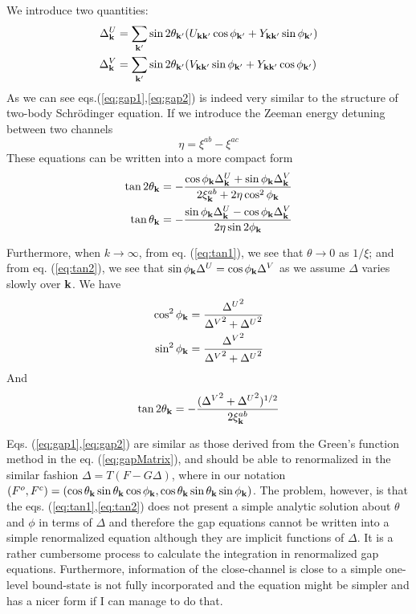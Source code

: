 We introduce two quantities:
\begin{align}
\Delta_{\mathbf{k}}^U&=\sum_{\mathbf{k}'}\sin2\theta_{\mathbf{k}'}(U_{\mathbf{k}\mathbf{k}'}\cos\phi_{\mathbf{k}'}+Y_{\mathbf{k}\mathbf{k}'}\sin\phi_{\mathbf{k}'})\label{eq:gap1}\\
\Delta_{\mathbf{k}}^V&=\sum_{\mathbf{k}'}\sin2\theta_{\mathbf{k}'}(V_{\mathbf{k}\mathbf{k}'}\sin\phi_{\mathbf{k}'}+Y_{\mathbf{k}\mathbf{k}'}\cos\phi_{\mathbf{k}'})\label{eq:gap2}
\end{align} 
As we can see eqs.(\ref{eq:gap1},\ref{eq:gap2}) is indeed very similar to the structure of two-body Schr\"{o}‌dinger equation.
If we ‌introduce the Zeeman energy detuning between two channels
\begin{equation}
\eta=\xi^{ab}-\xi^{ac}
\end{equation}
These equations can be written into a more compact form
\begin{align}
\tan2\theta_{\mathbf{k}}&=-\frac{\cos\phi_{\mathbf{k}}\Delta^U_{\mathbf{k}}+\sin\phi_{\mathbf{k}}\Delta^V_{\mathbf{k}}}{2\xi^{ab}_{\mathbf{k}}+2\eta\cos^2\phi_{\mathbf{k}}}\label{eq:tan1}\\
\tan\theta_{\mathbf{k}}&=-\frac{\sin\phi_{\mathbf{k}}\Delta^U_{\mathbf{k}}-\cos\phi_{\mathbf{k}}\Delta^V_{\mathbf{k}}}{2\eta\sin2\phi_{\mathbf{k}}}\label{eq:tan2}
\end{align} 


Furthermore, when $k\rightarrow\infty$, from eq. (\ref{eq:tan1}), we see that $\theta\rightarrow0$ as $1/\xi$;  and from eq. (\ref{eq:tan2}), we see that $\sin\phi_{\mathbf{k}}\Delta^U=\cos\phi_{\mathbf{k}}\Delta^V$ as we assume $\Delta$ varies slowly over $\mathbf{k}$.  We have 
\begin{align*}
\cos^2\phi_{\mathbf{k}}&=\frac{{\Delta^U}^2}{{\Delta^V}^2+{\Delta^U}^2}\\
\sin^2\phi_{\mathbf{k}}&=\frac{{\Delta^V}^2}{{\Delta^V}^2+{\Delta^U}^2}
\end{align*}
And 
\[\tan2\theta_{\mathbf{k}}=-\frac{({{\Delta^V}^2+{\Delta^U}^2})^{1/2}}{2\xi^{ab}_{\mathbf{k}}}\]

Eqs. (\ref{eq:gap1},\ref{eq:gap2}) are similar as those derived from the Green's function method in the eq. (\ref{eq:gapMatrix}), and should be able to renormalized in the similar fashion $\Delta=T(F-G\Delta)$, where in our notation $({F^o,F^c})=(\cos\theta_{\mathbf{k}}\sin\theta_{\mathbf{k}}\cos\phi_{\mathbf{k}},\cos\theta_{\mathbf{k}}\sin\theta_{\mathbf{k}}\sin\phi_{\mathbf{k}})$.  The problem, however, is that the eqs. (\ref{eq:tan1},\ref{eq:tan2}) does not present a simple analytic solution about $\theta$ and $\phi$ in terms of $\Delta$ and therefore the gap equations cannot be written into a simple renormalized  equation although they are implicit functions of $\Delta$.
 It is a rather cumbersome process to calculate the integration in renormalized gap equations.  Furthermore, information of the close-channel is close to a simple one-level bound-state is not fully incorporated and the equation might be simpler and has a nicer form if I can manage to do that.  

